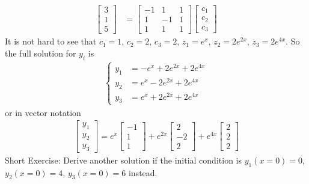 \begin{exmp}
\begin{align*}
\begin{bmatrix}
3 \\
1 \\
5
\end{bmatrix}
&=
\begin{bmatrix}
-1 & 1 & 1 \\
1 & -1 & 1 \\
1 & 1 & 1
\end{bmatrix}
\begin{bmatrix}
c_1 \\
c_2 \\
c_3
\end{bmatrix}
\end{align*}
It is not hard to see that $c_1 = 1$, $c_2 = 2$, $c_3 = 2$, $z_1 = e^x$, $z_2 = 2e^{2x}$, $z_3 = 2e^{4x}$. So the full solution for $y_i$ is
\begin{align*}
\begin{cases}
y_1 &= -e^{x} + 2e^{2x} + 2e^{4x} \\
y_2 &= e^{x} - 2e^{2x} + 2e^{4x} \\
y_3 &= e^{x} + 2e^{2x} + 2e^{4x}
\end{cases}
\end{align*}
or in vector notation
\begin{align*}
\begin{bmatrix}
y_1 \\
y_2 \\
y_3
\end{bmatrix}
=
e^{x}
\begin{bmatrix}
-1 \\
1 \\
1
\end{bmatrix}
+
e^{2x}
\begin{bmatrix}
2 \\
-2 \\
2
\end{bmatrix}
+
e^{4x}
\begin{bmatrix}
2 \\
2 \\
2
\end{bmatrix}
\end{align*}
Short Exercise: Derive another solution if the initial condition is $y_1(x=0) = 0$, $y_2(x=0) = 4$, $y_3(x=0) = 6$ instead.
\end{exmp}

